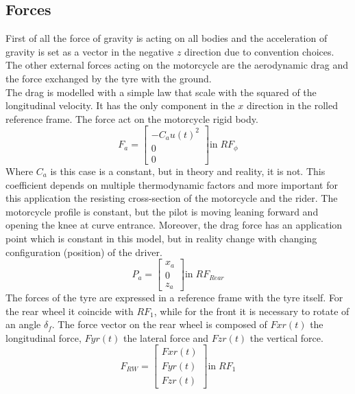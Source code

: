 \subsection{Forces}
%
First of all the force of gravity is acting on all bodies and the acceleration of gravity is set as a vector in the negative $z$ direction due to convention choices.\\
The other external forces acting on the motorcycle are the aerodynamic drag and the force exchanged by the tyre with the ground.\\
The drag is modelled with a simple law that scale with the squared of the longitudinal velocity. It has the only component in the $x$ direction in the rolled reference frame. The force act on the motorcycle rigid body.
%
\begin{equation}
    F_a = 
    \left[
    \begin{array}{c}
        -C_a u(t)^2\\
        0\\
        0
    \end{array}
    \right ]
    \text{in} \; RF_\phi
\end{equation}
%
Where $C_a$ is this case is a constant, but in theory and reality, it is not. This coefficient depends on multiple thermodynamic factors and more important for this application the resisting cross-section of the motorcycle and the rider. The motorcycle profile is constant, but the pilot is moving leaning forward and opening the knee at curve entrance. 
Moreover, the drag force has an application point which is constant in this model, but in reality change with changing configuration (position) of the driver.
%
\begin{equation}
    P_a = 
    \left[
    \begin{array}{c}
        x_a\\
        0\\
        z_a
    \end{array}
    \right ]
    \text{in} \; RF_{Rear}
\end{equation}
%
The forces of the tyre are expressed in a reference frame with the tyre itself. For the rear wheel it coincide with $RF_1$, while for the front it is necessary to rotate of an angle $\delta_f$.
The force vector on the rear wheel is composed of $Fxr(t)$ the longitudinal force, $Fyr(t)$ the lateral force and $Fzr(t)$ the vertical force.
%
\begin{equation}
    F_{RW} = 
    \left[
    \begin{array}{c}
        Fxr(t)\\
        Fyr(t)\\
        Fzr(t)
    \end{array}
    \right ]
    \text{in} \; RF_1
\end{equation}
